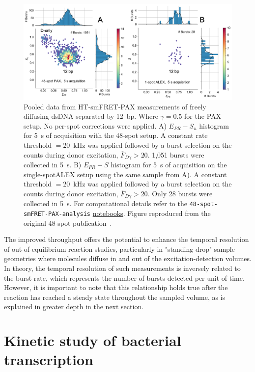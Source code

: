 \begin{figure}
\centering
\includegraphics[width=1.0\linewidth]{chapters/figures/pooled_setup_comparison.png}
\caption{\label{fig:pooled_comparison} 
Pooled data from \ac{HT-smFRET}-PAX 
measurements of freely diffusing dsDNA separated by 12~\ac{bp}. 
Where $\gamma= 0.5$ for the \ac{PAX} setup. 
No per-spot corrections were applied. 
A) $E_{PR} - S_u$ histogram for 5~s of acquisition with the 48-spot setup. 
A constant rate threshold $= 20$~kHz was applied followed by a burst selection on the counts during
donor excitation, $\overline{F}_{D\gamma} > 20$. 
1,051 bursts were collected in 5~s. 
B) $E_{PR} - S$ histogram for 5~s of acquisition on the single-spot\ac{ALEX} setup using the same sample from A). 
A constant threshold $= 20$~kHz was applied followed by a burst selection on the counts during donor excitation, $\overline{F}_{D\gamma} > 20$.
Only 28 bursts were collected in 5~s. 
For computational details refer to the \texttt{48-spot-smFRET-PAX-analysis} 
\href{https://github.com/tritemio/48-spot-smFRET-PAX-analysis}{notebooks}.
Figure reproduced from the original 48-spot publication~\cite{ingargiola_JCP_2018}.}
\end{figure}

The improved throughput offers the potential to enhance the temporal resolution of out-of-equilibrium reaction studies, particularly in "standing drop" sample geometries where molecules diffuse in and out of the excitation-detection volumes. 
In theory, the temporal resolution of such measurements is inversely related to the burst rate, which represents the number of bursts detected per unit of time. 
However, it is important to note that this relationship holds true after the reaction has reached a steady state throughout the sampled volume, as is explained in greater depth in the next section.

\section{Kinetic study of bacterial transcription}

